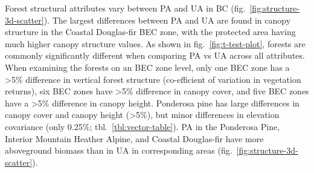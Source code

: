 \documentclass[11pt]{article}
\begin{document}
Forest structural attributes vary between PA and UA in BC
(fig.~\ref{fig:structure-3d-scatter}). The largest differences between
PA and UA are found in canopy structure in the Coastal Douglas-fir BEC
zone, with the protected area having much higher canopy structure
values. As shown in fig.~\ref{fig:t-test-plot}, forests are commonly
significantly different when comparing PA vs UA across all attributes.
When examining the forests on an BEC zone level, only one BEC zone has a
\textgreater5\% difference in vertical forest structure (co-efficient of
variation in vegetation returns), six BEC zones have \textgreater5\%
difference in canopy cover, and five BEC zones have a \textgreater5\%
difference in canopy height. Ponderosa pine has large differences in
canopy cover and canopy height (\textgreater5\%), but minor differences
in elevation covariance (only 0.25\%; tbl.~\ref{tbl:vector-table}). PA
in the Ponderosa Pine, Interior Mountain Heather Alpine, and Coastal
Douglas-fir have more aboveground biomass than in UA in corresponding
areas (fig.~\ref{fig:structure-3d-scatter}).
\end{document}
